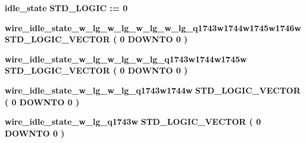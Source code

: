 \begin{DoxyCompactItemize}
\item 
{\bf idle\+\_\+state} {\bfseries \textcolor{comment}{S\+T\+D\+\_\+\+L\+O\+G\+IC}\textcolor{vhdlchar}{ }\textcolor{vhdlchar}{ }\textcolor{vhdlchar}{\+:}\textcolor{vhdlchar}{=}\textcolor{vhdlchar}{ }\textcolor{vhdlchar}{ }\textcolor{vhdlchar}{\textquotesingle{}}\textcolor{vhdlchar}{ } \textcolor{vhdldigit}{0} \textcolor{vhdlchar}{ }\textcolor{vhdlchar}{\textquotesingle{}}\textcolor{vhdlchar}{ }} 
\item 
{\bf wire\+\_\+idle\+\_\+state\+\_\+w\+\_\+lg\+\_\+w\+\_\+lg\+\_\+w\+\_\+lg\+\_\+w\+\_\+lg\+\_\+q1743w1744w1745w1746w} {\bfseries \textcolor{comment}{S\+T\+D\+\_\+\+L\+O\+G\+I\+C\+\_\+\+V\+E\+C\+T\+OR}\textcolor{vhdlchar}{ }\textcolor{vhdlchar}{(}\textcolor{vhdlchar}{ }\textcolor{vhdlchar}{ } \textcolor{vhdldigit}{0} \textcolor{vhdlchar}{ }\textcolor{keywordflow}{D\+O\+W\+N\+TO}\textcolor{vhdlchar}{ }\textcolor{vhdlchar}{ } \textcolor{vhdldigit}{0} \textcolor{vhdlchar}{ }\textcolor{vhdlchar}{)}\textcolor{vhdlchar}{ }} 
\item 
{\bf wire\+\_\+idle\+\_\+state\+\_\+w\+\_\+lg\+\_\+w\+\_\+lg\+\_\+w\+\_\+lg\+\_\+q1743w1744w1745w} {\bfseries \textcolor{comment}{S\+T\+D\+\_\+\+L\+O\+G\+I\+C\+\_\+\+V\+E\+C\+T\+OR}\textcolor{vhdlchar}{ }\textcolor{vhdlchar}{(}\textcolor{vhdlchar}{ }\textcolor{vhdlchar}{ } \textcolor{vhdldigit}{0} \textcolor{vhdlchar}{ }\textcolor{keywordflow}{D\+O\+W\+N\+TO}\textcolor{vhdlchar}{ }\textcolor{vhdlchar}{ } \textcolor{vhdldigit}{0} \textcolor{vhdlchar}{ }\textcolor{vhdlchar}{)}\textcolor{vhdlchar}{ }} 
\item 
{\bf wire\+\_\+idle\+\_\+state\+\_\+w\+\_\+lg\+\_\+w\+\_\+lg\+\_\+q1743w1744w} {\bfseries \textcolor{comment}{S\+T\+D\+\_\+\+L\+O\+G\+I\+C\+\_\+\+V\+E\+C\+T\+OR}\textcolor{vhdlchar}{ }\textcolor{vhdlchar}{(}\textcolor{vhdlchar}{ }\textcolor{vhdlchar}{ } \textcolor{vhdldigit}{0} \textcolor{vhdlchar}{ }\textcolor{keywordflow}{D\+O\+W\+N\+TO}\textcolor{vhdlchar}{ }\textcolor{vhdlchar}{ } \textcolor{vhdldigit}{0} \textcolor{vhdlchar}{ }\textcolor{vhdlchar}{)}\textcolor{vhdlchar}{ }} 
\item 
{\bf wire\+\_\+idle\+\_\+state\+\_\+w\+\_\+lg\+\_\+q1743w} {\bfseries \textcolor{comment}{S\+T\+D\+\_\+\+L\+O\+G\+I\+C\+\_\+\+V\+E\+C\+T\+OR}\textcolor{vhdlchar}{ }\textcolor{vhdlchar}{(}\textcolor{vhdlchar}{ }\textcolor{vhdlchar}{ } \textcolor{vhdldigit}{0} \textcolor{vhdlchar}{ }\textcolor{keywordflow}{D\+O\+W\+N\+TO}\textcolor{vhdlchar}{ }\textcolor{vhdlchar}{ } \textcolor{vhdldigit}{0} \textcolor{vhdlchar}{ }\textcolor{vhdlchar}{)}\textcolor{vhdlchar}{ }} 

\end{DoxyCompactItemize}

